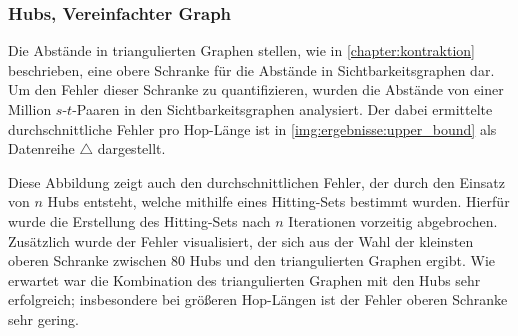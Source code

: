 \subsubsection{Hubs, Vereinfachter Graph}


Die Abstände in triangulierten Graphen stellen, wie in \autoref{chapter:kontraktion} beschrieben, eine obere Schranke für die Abstände in Sichtbarkeitsgraphen dar.
Um den Fehler dieser Schranke zu quantifizieren, wurden die Abstände von einer Million $s$-$t$-Paaren in den Sichtbarkeitsgraphen analysiert.
Der dabei ermittelte durchschnittliche Fehler pro Hop-Länge ist in \autoref{img:ergebnisse:upper_bound} als Datenreihe $\triangle$ dargestellt.

Diese Abbildung zeigt auch den durchschnittlichen Fehler, der durch den Einsatz von $n$ Hubs entsteht, welche mithilfe eines Hitting-Sets bestimmt wurden.
Hierfür wurde die Erstellung des Hitting-Sets nach $n$ Iterationen vorzeitig abgebrochen.
Zusätzlich wurde der Fehler visualisiert, der sich aus der Wahl der kleinsten oberen Schranke zwischen 80 Hubs und den triangulierten Graphen ergibt.
Wie erwartet war die Kombination des triangulierten Graphen mit den Hubs sehr erfolgreich; insbesondere bei größeren Hop-Längen ist der Fehler oberen Schranke sehr gering.

